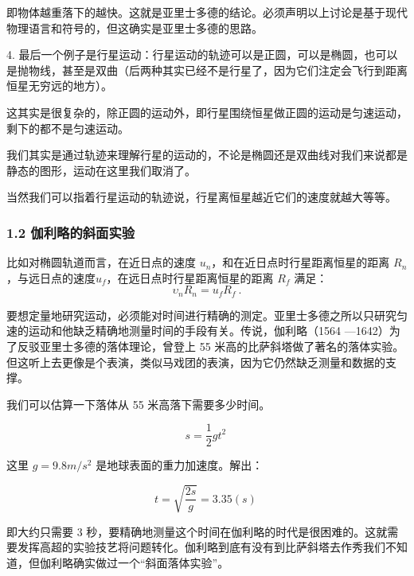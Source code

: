 即物体越重落下的越快。这就是亚里⼠多德的结论。必须声明以上讨论是基于现代物理语⾔和符号的，但这确实是亚里⼠多德的思路。

4. 最后⼀个例⼦是⾏星运动：⾏星运动的轨迹可以是正圆，可以是椭圆，也可以是抛物线，甚⾄是双曲（后两种其实已经不是⾏星了，因为它们注定会飞⾏到距离恒星⽆穷远的地⽅）。

这其实是很复杂的，除正圆的运动外，即⾏星围绕恒星做正圆的运动是匀速运动，剩下的都不是匀速运动。

我们其实是通过轨迹来理解⾏星的运动的，不论是椭圆还是双曲线对我们来说都是静态的图形，运动在这里我们取消了。

当然我们可以指着⾏星运动的轨迹说，⾏星离恒星越近它们的速度就越⼤等等。

\subsubsection{1.2 伽利略的斜面实验}

比如对椭圆轨道⽽⾔，在近日点的速度 $u_n$，和在近日点时⾏星距离恒星的距离 $R_n$，与远日点的速度$u_f$，在远日点时⾏星距离恒星的距离 $R_f$ 满⾜：
\begin{equation}
\upsilon_nR_n = u_fR_f~.
\end{equation}

要想定量地研究运动，必须能对时间进⾏精确的测定。亚里⼠多德之所以只研究匀速的运动和他缺乏精确地测量时间的⼿段有关。传说，伽利略（1564 —1642）为了反驳亚里⼠多德的落体理论，曾登上 55 米⾼的比萨斜塔做了著名的落体实验。但这听上去更像是个表演，类似马戏团的表演，因为它仍然缺乏测量和数据的支撑。

我们可以估算⼀下落体从 55 米⾼落下需要多少时间。

\begin{equation}
s=\frac{1}{2}gt^2~
\end{equation}

这里 $g = 9.8m/s^2$ 是地球表面的重⼒加速度。解出：

\begin{equation}
t=\sqrt{\frac{2s}{g}}=3.35(s)~
\end{equation}

即⼤约只需要 3 秒，要精确地测量这个时间在伽利略的时代是很困难的。这就需要发挥⾼超的实验技艺将问题转化。伽利略到底有没有到比萨斜塔去作秀我们不知道，但伽利略确实做过⼀个“斜面落体实验”。

